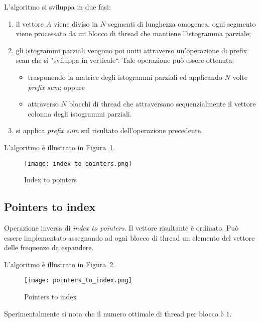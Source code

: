 L'algoritmo si sviluppa in due fasi:
\begin{enumerate}
    \item il vettore $A$ viene diviso in $N$ segmenti di lunghezza omogenea, ogni segmento viene processato da un blocco di thread che mantiene l'istogramma parziale;
    \item gli istogrammi parziali vengono poi uniti attraverso un'operazione di prefix scan che si "sviluppa in verticale``. Tale operazione può essere ottenuta:
    \begin{itemize}
        \item trasponendo la matrice degli istogrammi parziali ed applicando $N$ volte \emph{prefix sum}; oppure
        \item attraverso $N$ blocchi di thread che attraversano sequenzialmente il vettore colonna degli istogrammi parziali.
    \end{itemize}
    \item si applica \emph{prefix sum} sul risultato dell'operazione precedente.
\end{enumerate}

L'algoritmo è illustrato in Figura~\ref{index_to_pointers}. 

\begin{figure}[t]
    \centering
	\texttt{[image: index\_to\_pointers.png]}
	\caption{Index to pointers}
	\label{index_to_pointers}
\end{figure}

\subsection{Pointers to index}
\label{pnt-to-idx}
Operazione inversa di \emph{index to pointers}. Il vettore risultante è ordinato. Può essere implementato assegnando ad ogni blocco di thread un elemento del vettore delle frequenze da espandere. 

L'algoritmo è illustrato in Figura~\ref{pointers_to_index}. 

\begin{figure}[t]
    \centering
	\texttt{[image: pointers\_to\_index.png]}
	\caption{Pointers to index}
	\label{pointers_to_index}
\end{figure}

Sperimentalmente si nota che il numero ottimale di thread per blocco è $1$.

